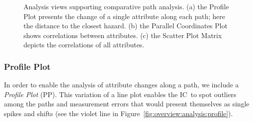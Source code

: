 \documentclass{egpubl}
\def\IC{IC}
\begin{document}
\begin{figure}
	\centering
	\hfill
	\hfill
	\caption{Analysis views supporting comparative path analysis. (a) the Profile Plot presents the change of a single attribute along each path; here the distance to the closest hazard. (b) the Parallel Coordinates Plot shows correlations between attributes. (c) the Scatter Plot Matrix depicts the correlations of all attributes.}
\end{figure}

\subsubsection{Profile Plot} \label{sec:overview:analysis:profile}
In order to enable the analysis of attribute changes along a path, we include a \emph{Profile Plot} (PP). This variation of a line plot enables the \IC\ to spot outliers among the paths and measurement errors that would present themselves as single spikes and shifts (see the violet line in Figure~\ref{fig:overview:analysis:profile}).
\end{document}
